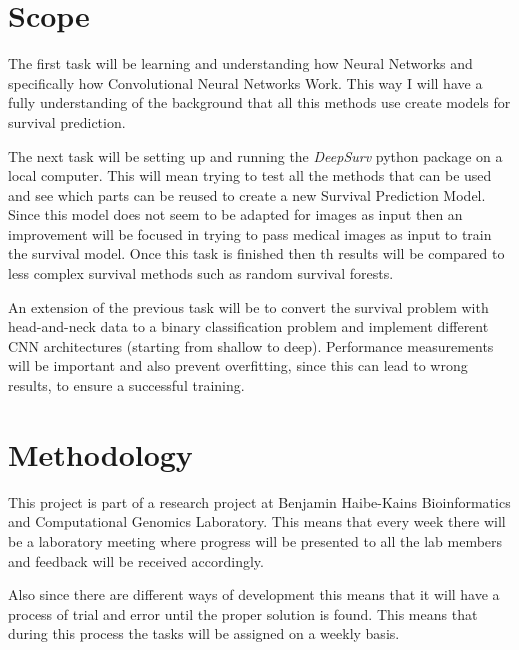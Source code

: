 \section{Scope}

The first task will be learning and understanding how Neural Networks and specifically how 
Convolutional Neural Networks Work. This way I will have a fully understanding of the background
that all this methods use create models for survival prediction.

The next task will be setting up and running the \emph{DeepSurv} python package on a local computer.
This will mean trying to test all the methods that can be used and see which parts can be reused 
to create a new Survival Prediction Model. Since this model does not seem to be adapted for images
as input then an improvement will be focused in trying to pass medical images as input to train
the survival model. Once this task is finished then th results will be compared to less complex
survival methods such as random survival forests.

An extension of the previous task will be to convert the survival problem with head-and-neck data
to a binary classification problem and implement different CNN architectures (starting from 
shallow to deep). Performance measurements will be important and also prevent overfitting, since 
this can lead to wrong results, to ensure a successful training.

\section{Methodology}

This project is part of a research project at Benjamin Haibe-Kains Bioinformatics and 
Computational Genomics Laboratory. This means that every week there will be a laboratory meeting
where progress will be presented to all the lab members and feedback will be received accordingly. 

Also since there are different ways of development this means that it will have a process of trial
and error until the proper solution is found. This means that during this process the
tasks will be assigned on a weekly basis.
